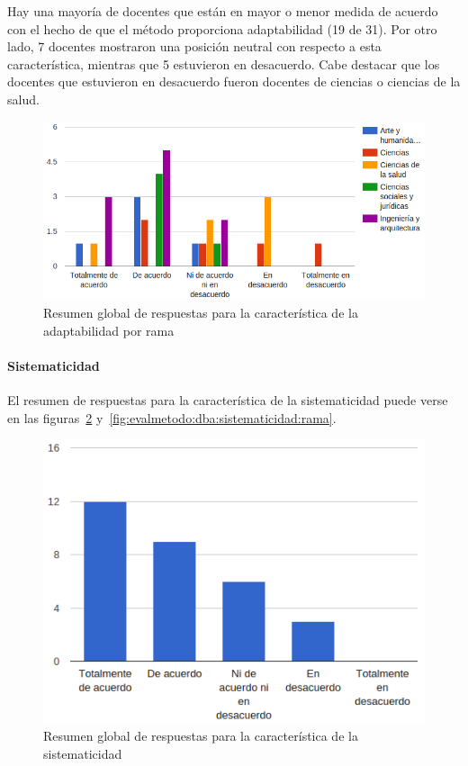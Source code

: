 Hay una mayoría de docentes que están en mayor o menor medida de acuerdo con el hecho de que el método proporciona adaptabilidad (19 de 31). Por otro lado, 7 docentes mostraron una posición neutral con respecto a esta característica, mientras que 5 estuvieron en desacuerdo. Cabe destacar que los docentes que estuvieron en desacuerdo fueron docentes de ciencias o ciencias de la salud.

\begin{figure}[h]
  \begin{center}
    \includegraphics[scale=0.45]{C_DBA_adaptabilidad_rama.png}
  \end{center}
  \caption{Resumen global de respuestas para la característica de la adaptabilidad por rama}
  \label{fig:evalmetodo:dba:adaptabilidad:rama}
\end{figure}

\newpage
\paragraph*{Sistematicidad}

El resumen de respuestas para la característica de la sistematicidad puede verse en las figuras~\ref{fig:evalmetodo:dba:sistematicidad} y~\ref{fig:evalmetodo:dba:sistematicidad:rama}.

\begin{figure}[h]
  \begin{center}
    \includegraphics[scale=0.40]{C_DBA_sistematicidad.png}
  \end{center}
  \caption{Resumen global de respuestas para la característica de la sistematicidad}
  \label{fig:evalmetodo:dba:sistematicidad}
\end{figure}

